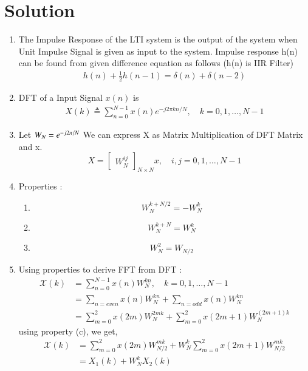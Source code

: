 \documentclass[journal,12pt,twocolumn]{IEEEtran}
\renewcommand\thesection{\arabic{section}}
\begin{document}
\section{Solution}
\begin{enumerate}[label=\thesection.\arabic*.,ref=\thesection.\theenumi]
\item
The Impulse Response of the LTI system is the output of the system when Unit Impulse Signal is given as input to the system.
Impulse response h(n) can be found from given difference equation as follows (h(n) is IIR Filter)
\begin{align}
    h(n) + \frac{1}{2}h(n-1) = \delta(n) + \delta(n-2)	
    \label{eq:equation4}
\end{align}

\item
DFT of a Input Signal $x(n)$ is 
\begin{align}
X(k) \triangleq \sum_{n=0}^{N-1} x(n) e^{-j 2 \pi k n / N}, \quad k=0,1, \ldots, N-1
\end{align}

\item
Let $W_{N} = e^{-j2\pi/N} \\$ 
We can express X as Matrix Multiplication of DFT Matrix and x.
\begin{equation}
X = 
\begin{bmatrix}
W^{ij}_{N} 
\end{bmatrix}_{N \times N}
x, \quad i,j = 0,1, \ldots, N-1
\end{equation}





\item
Properties :
\begin{enumerate}
	\item \[ W^{k+N/2}_{N} = - W^{k}_{N} \] 
	\item \[ W^{k+N}_{N} =  W^{k}_{N} \] 
	\item \[ W^{2}_{N} =  W_{N/2} \] 
\end{enumerate}
\item 
Using properties to derive FFT from DFT :
\begin{align}
\mathcal X(k) &=  \sum_{n=0}^{N-1} x(n)W^{kn}_{N}, \quad k=0,1, \ldots, N-1 \\
&= \sum_{n=even} x(n)W^{kn}_{N} + \sum_{n=odd} x(n)W^{kn}_{N} \\
&= \sum_{m=0}^{2} x(2m)W^{2mk}_{N} + \sum_{m=0}^{2} x(2m+1)W^{(2m+1)k}_{N} 
\end{align}
using property (c), we get,
\begin{align}
\mathcal X(k) &= \sum_{m=0}^{2} x(2m)W^{mk}_{N/2} + W^{k}_{N} \sum_{m=0}^{2} x(2m+1)W^{mk}_{N/2} \\
&= X_{1}(k) + W^{k}_{N}X_{2}(k)
\end{align}


\end{enumerate}
\end{document}
